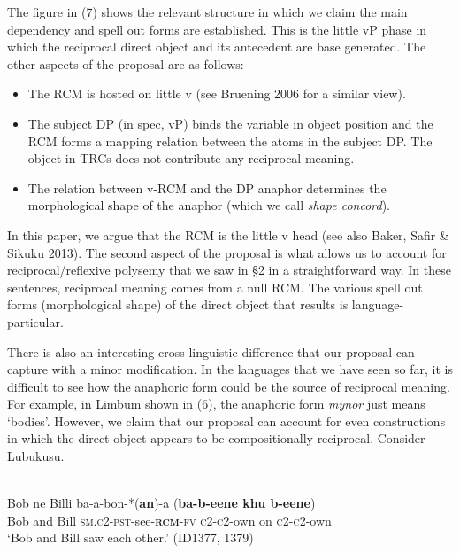 \documentclass[output=paper]{langsci/langscibook}
\begin{document}
 


 



The figure in (7) shows the relevant structure in which we claim the main dependency and spell out forms are established. This is the little vP phase in which the reciprocal direct object and its antecedent are base generated. The other aspects of the proposal are as follows:


\begin{itemize}
\item The RCM is hosted on little v (see Bruening 2006 for a similar view).

\item The subject DP (in spec, vP) binds the variable in object position and the RCM forms a mapping relation between the atoms in the subject DP. The object in TRCs does not contribute any reciprocal meaning.

\item The relation between v-RCM and the DP anaphor determines the morphological shape of the anaphor (which we call \textit{shape concord}).

\end{itemize}

In this paper, we argue that the RCM is the little v head (see also Baker, Safir \& Sikuku 2013). The second aspect of the proposal is what allows us to account for reciprocal/reflexive polysemy that we saw in §2 in a straightforward way. In these sentences, reciprocal meaning comes from a null RCM. The various spell out forms (morphological shape) of the direct object that results is language-particular. 

  There is also an interesting cross-linguistic difference that our proposal can capture with a minor modification. In the languages that we have seen so far, it is difficult to see how the anaphoric form could be the source of reciprocal meaning. For example, in Limbum shown in (6), the anaphoric form \textit{mynor} just means ‘bodies’. However, we claim that our proposal can account for even constructions in which the direct object appears to be compositionally reciprocal. Consider Lubukusu.



\ea\label{ex:}
\\
\gll Bob  ne  Billi  ba-a-bon-*(\textbf{an})-a     (\textbf{ba-b-eene  khu b-eene}) \\
Bob   and   Bill   \textsc{sm.c2-pst}-see-\textbf{\textsc{rcm}}\textsc{-fv}   \textsc{c2-c2}-own on \textsc{c2-c2}-own \\
\glt ‘Bob and Bill saw each other.’  (ID1377, 1379) 
\z
\end{document}
